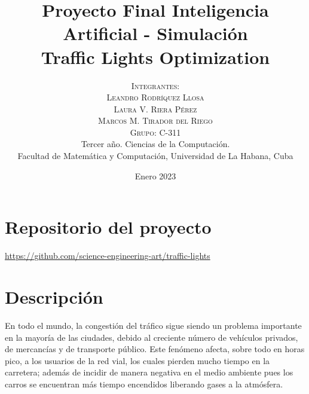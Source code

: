 \documentclass[twoside,twocolumn]{article} %
\title{\normalsize{Proyecto Final Inteligencia Artificial - Simulaci\'on}\\
	\Huge\bfseries Traffic Lights Optimization\\
} %
\author{%
	\normalsize\textsc{Integrantes:}\\
	\normalsize\textsc{Leandro Rodr\'iquez Llosa}\\
	\normalsize\textsc{Laura V. Riera P\'erez}\\ 
	\normalsize\textsc{Marcos M. Tirador del Riego} \\[2ex]
	\normalsize\textsc{Grupo: C-311} \\[2ex]
	\small Tercer a\~no. Ciencias de la Computaci\'on. \\ %
	\small Facultad de Matem\'atica y Computaci\'on, Universidad de La Habana, Cuba \\ %
}
\date{\footnotesize Enero 2023 } %
\begin{document}
	\maketitle
	
	
	
	\section{Repositorio del proyecto}
	
	\begin{center}
		\href{https://github.com/science-engineering-art/traffic-lights}{https://github.com/science-engineering-art/traffic-lights}
	\end{center}
	
	\section{Descripción}
	
	En todo el mundo, la congestión del tráfico sigue siendo un problema importante en la mayoría de las ciudades, debido al creciente número de vehículos privados,  de mercancías y de transporte público. Este fenómeno afecta, sobre todo en horas pico, a los usuarios de la red vial, los cuales pierden mucho tiempo en la carretera;  además de incidir de manera negativa en el medio ambiente pues los carros se encuentran más tiempo encendidos liberando gases a la atmósfera.
	
\end{document}

